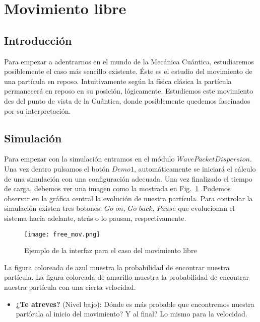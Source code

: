 \section{Movimiento libre}

\subsection{Introducci\'on}
Para empezar a adentrarnos en el mundo de la Mec\'anica Cu\'antica, estudiaremos posiblemente el caso m\'as sencillo existente. \'Este es el estudio del movimiento de una part\'icula en reposo. Intuitivamente seg\'un la f\'isica cl\'asica la part\'icula permanecer\'a en reposo en su posici\'on, l\'ogicamente. Estudiemos este movimiento des del punto de vista de la Cu\'antica, donde posiblemente quedemos fascinados por su interpretaci\'on.
\\
\subsection{Simulaci\'on}
Para empezar con la simulaci\'on entramos en el m\'odulo $Wave Packet Dispersion$. Una vez dentro pulsamos el bot\'on $Demo 1$, autom\'aticamente se iniciar\'a el c\'alculo de una simulaci\'on con una configuraci\'on adecuada. Una vez finalizado el tiempo de carga, debemos ver una imagen como la mostrada en Fig.~\ref{Fig:free_mov} .Podemos observar en la gr\'afica central la evoluci\'on de nuestra part\'icula. Para controlar la simulaci\'on existen tres botones: $Go$ $on$, $Go$ $back$, $Pause$ que evolucionan el sistema hacia adelante, atr\'as o lo pausan, respectivamente. 
\\

\begin{figure}[tb]
	\centering
	\texttt{[image: free\_mov.png]}
	\caption{Ejemplo de la interfaz para el caso del movimiento libre}
	\label{Fig:free_mov}
\end{figure}

La figura coloreada de azul muestra la probabilidad de encontrar nuestra part\'icula. La figura coloreada de amarillo muestra la probabilidad de encontrar nuestra part\'icula con una cierta velocidad.
\begin{itemize}
	\item \textbf{¿Te atreves?} (Nivel bajo): D\'onde es m\'as probable que encontremos nuestra part\'icula al inicio del movimiento? Y al final? Lo mismo para la velocidad.
\end{itemize}



